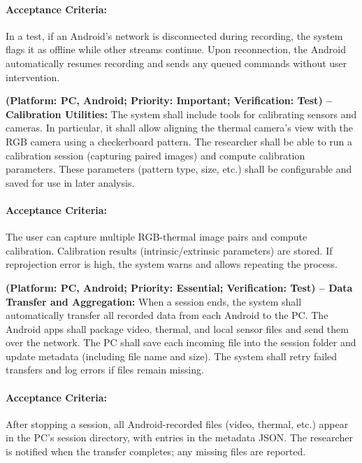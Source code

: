 \begin{description}[style=unboxed,leftmargin=0cm]
    \paragraph{Acceptance Criteria:} In a test, if an Android’s network is disconnected during recording, the system flags it as offline while other streams continue. Upon reconnection, the Android automatically resumes recording and sends any queued commands without user intervention.

    \item[\textbf{FR9}] \textbf{(Platform: PC, Android; Priority: Important; Verification: Test) – Calibration Utilities:} The system shall include tools for calibrating sensors and cameras. In particular, it shall allow aligning the thermal camera’s view with the RGB camera using a checkerboard pattern. The researcher shall be able to run a calibration session (capturing paired images) and compute calibration parameters. These parameters (pattern type, size, etc.) shall be configurable and saved for use in later analysis.

    \paragraph{Acceptance Criteria:} The user can capture multiple RGB-thermal image pairs and compute calibration. Calibration results (intrinsic/extrinsic parameters) are stored. If reprojection error is high, the system warns and allows repeating the process.

    \item[\textbf{FR10}] \textbf{(Platform: PC, Android; Priority: Essential; Verification: Test) – Data Transfer and Aggregation:} When a session ends, the system shall automatically transfer all recorded data from each Android to the PC. The Android apps shall package video, thermal, and local sensor files and send them over the network. The PC shall save each incoming file into the session folder and update metadata (including file name and size). The system shall retry failed transfers and log errors if files remain missing.

    \paragraph{Acceptance Criteria:} After stopping a session, all Android-recorded files (video, thermal, etc.) appear in the PC’s session directory, with entries in the metadata JSON. The researcher is notified when the transfer completes; any missing files are reported.
\end{description}


